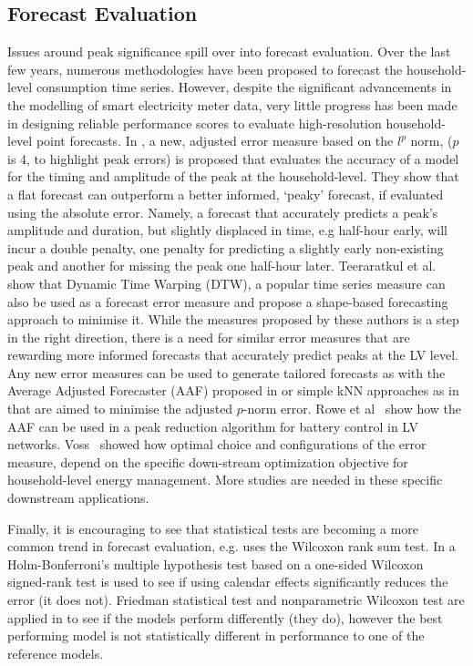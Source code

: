 \subsection{Forecast Evaluation}
\label{subsec:eval} 
Issues around peak significance spill over into forecast evaluation. Over the last few years, numerous methodologies have been proposed to forecast the household-level consumption time series. However, despite the significant advancements in the modelling of smart electricity meter data, very little progress has been made in designing reliable performance scores to evaluate high-resolution household-level point forecasts. In \cite{Haben2014ane}, a new, adjusted error measure based on the $l^p$ norm, ($p$ is 4, to highlight peak errors) is proposed that evaluates the accuracy of a model for the timing and amplitude of the peak at the household-level. They show that a flat forecast can outperform a better informed, `peaky' forecast, if evaluated using the absolute error. Namely,  a forecast that accurately predicts a peak's amplitude and duration, but slightly displaced in time, e.g half-hour early, will incur a double penalty, one penalty for predicting a slightly early non-existing peak and another for missing the peak one half-hour later. Teeraratkul et al.~\cite{teeraratkul2017sba} show that Dynamic Time Warping (DTW), a popular time series measure can also be used as a forecast error measure and propose a shape-based forecasting approach to minimise it. While the measures proposed by these authors \cite{Haben2014ane, teeraratkul2017sba} is a step in the right direction, there is a need for similar error measures that are rewarding more informed forecasts that accurately predict peaks at the LV level. Any new error measures can be used to generate tailored forecasts as with the Average Adjusted Forecaster (AAF) proposed in \cite{Haben2014ane} or simple kNN approaches as in \cite{voss2018adjusted} that are aimed to minimise the adjusted $p$-norm error. Rowe et al~\cite{rowe2014apr} show how the AAF can be used in a peak reduction algorithm for battery control in LV networks. Voss~\cite{voss2020pbr} showed how optimal choice and configurations of the error measure, depend on the specific down-stream optimization objective for household-level energy management. More studies are needed in these specific downstream applications.

Finally, it is encouraging to see that statistical tests are becoming a more common trend in forecast evaluation, e.g. \cite{grmanova2016iel} uses the Wilcoxon rank sum test. In \cite{lusis2017str}  a Holm-Bonferroni's multiple hypothesis test based on a one-sided Wilcoxon signed-rank test is used to see if using calendar effects significantly reduces the error (it does not). Friedman statistical test and nonparametric Wilcoxon test are applied in \cite{gerossier2018rda} to see if the models perform differently (they do), however the best performing model is not statistically different in performance to one of the reference models. 


